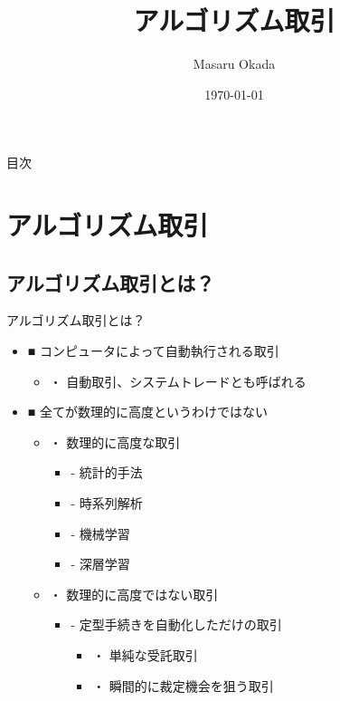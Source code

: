 \documentclass[dvipdfmx, autodetect-engine, aspectratio=169, 10.5pt]{beamer}
\title{アルゴリズム取引}
\author{Masaru Okada}
\date{\today}
\begin{document}
\begin{frame}[plain]
	\titlepage
\end{frame}

\begin{frame}{目次}
	\tableofcontents
\end{frame}

\section{アルゴリズム取引}

\subsection{アルゴリズム取引とは？}
\begin{frame}{アルゴリズム取引とは？}
	\begin{itemize}
		\item ■ コンピュータによって自動執行される取引
		      \begin{itemize}
			      \item ・ 自動取引、システムトレードとも呼ばれる
		      \end{itemize}
		\item ■ 全てが数理的に高度というわけではない
		      \begin{itemize}
			      \item ・ 数理的に高度な取引
			            \begin{itemize}
				            \item - 統計的手法
				            \item - 時系列解析
				            \item - 機械学習
				            \item - 深層学習
			            \end{itemize}
			      \item ・ 数理的に高度ではない取引
			            \begin{itemize}
				            \item - 定型手続きを自動化しただけの取引
				                  \begin{itemize}
					                  \item ・ 単純な受託取引
					                  \item ・ 瞬間的に裁定機会を狙う取引
				                  \end{itemize}
			            \end{itemize}
		      \end{itemize}
	\end{itemize}
\end{frame}
\end{document}
